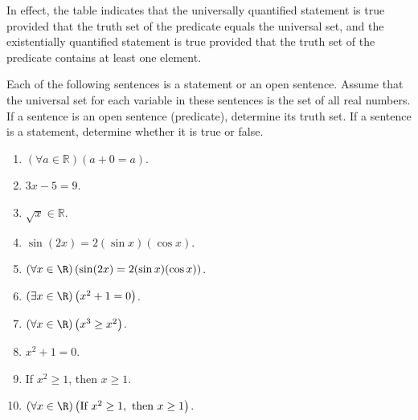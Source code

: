 \begin{previewactivity}
In effect, the table indicates that the universally quantified statement is true provided that the truth set of the predicate equals the universal set, and the existentially quantified statement is true provided that the truth set of the predicate contains at least one element.  
  \item Each of the following sentences is a statement or an open sentence.  Assume that the universal set for each variable in these sentences is the set of all real numbers.  If a sentence is an open sentence (predicate), determine its truth set.  If a sentence is a statement, determine whether it is true or false. \label{exer:sec21-4}
  \begin{enumerate}
    \item $\left( \forall a \in \mathbb{R}\right) \left(a + 0 = a\right)$.
    \item $3x - 5 = 9$.
    \item $\sqrt x  \in \mathbb{R}$.
    \item $\sin( {2x} ) = 2( {\sin x} )( {\cos x})$.
    \item $\left( \forall x \in \R\right) \left(\sin( {2x} ) = 2( {\sin x})( {\cos x}) \right)$.
    \item $\left( \exists x \in \R \right)\left( x^2  + 1 = 0 \right)$.
    \item $\left( \forall x \in \R \right) \left( x^3  \geq x^2 \right)$.
    \item $x^2  + 1 = 0$. 
    \item If  $x^2 \geq 1$, then  $x  \geq 1$.
    \item $\left( \forall x \in \R \right)\left( \text{If } x^2 \geq 1, \text{ then } x \geq 1 \right)$.
  \end{enumerate}





\end{previewactivity}
